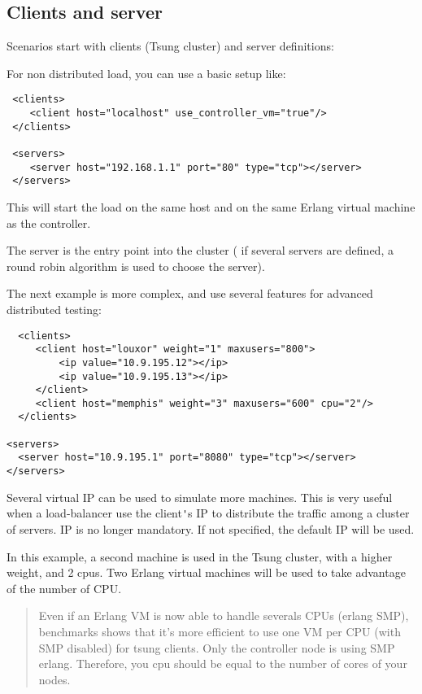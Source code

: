 \documentclass{TSUNG-en}
\begin{document}
\subsection{Clients and server}

 Scenarios start with clients (Tsung cluster) and server definitions:

For non distributed load, you can use a basic setup like:

\begin{Verbatim}
 <clients>
    <client host="localhost" use_controller_vm="true"/>
 </clients>

 <servers>
    <server host="192.168.1.1" port="80" type="tcp"></server>
 </servers>
 \end{Verbatim}

This will start the load on the same host and on the same Erlang
virtual machine as the controller.

The server is the entry point into the cluster (
if several servers are defined, a round robin algorithm is used to
choose the server).

The next example is more complex, and use several features for
advanced distributed testing:

\begin{Verbatim}
  <clients>
     <client host="louxor" weight="1" maxusers="800">
         <ip value="10.9.195.12"></ip>
         <ip value="10.9.195.13"></ip>
     </client>
     <client host="memphis" weight="3" maxusers="600" cpu="2"/>
  </clients>

<servers>
  <server host="10.9.195.1" port="8080" type="tcp"></server>
</servers>
 \end{Verbatim}


 Several virtual IP can be used to simulate more machines. This is
 very useful when a load-balancer use the client\verb|'|s IP to
 distribute the traffic among a cluster of servers.  IP is no longer mandatory. If not specified, the default IP will
 be used.

 In this example, a second machine is used in the Tsung cluster,
 with a higher weight, and 2 cpus. Two Erlang virtual machines will be
 used to take advantage of the number of CPU.

 \begin{quote}
  Even if an Erlang VM is now able to handle severals CPUs
 (erlang SMP), benchmarks shows that it's more efficient to use one VM
 per CPU (with SMP disabled) for tsung clients. Only the controller node is using SMP
 erlang. Therefore, you cpu should be equal to the number of cores of
 your nodes.
 \end{quote}
\end{document}

